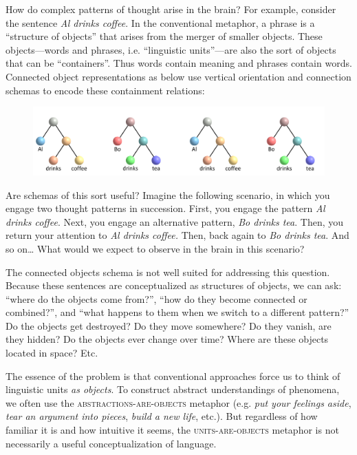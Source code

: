 How do complex patterns of thought arise in the brain? For example, consider the sentence \textit{Al drinks coffee}. In the conventional metaphor, a phrase is a “structure of objects” that arises from the merger of smaller objects. These objects—words and phrases, i.e. “linguistic units”—are also the sort of objects that can be “containers”. Thus words contain meaning and phrases contain words. Connected object representations as below use vertical orientation and connection schemas to encode these containment relations:

  
\begin{figure}
\includegraphics[width=\textwidth]{figures/Tilsen-img8.png}
\caption{\missingcaption}
\label{fig:2:1}
\end{figure}
 

  Are schemas of this sort useful? Imagine the following scenario, in which you engage two thought patterns in succession. First, you engage the pattern \textit{Al drinks coffee}. Next, you engage an alternative pattern, \textit{Bo drinks tea}. Then, you return your attention to \textit{Al drinks coffee.} Then, back again to \textit{Bo drinks tea}. And so on… What would we expect to observe in the brain in this scenario? 

  The connected objects schema is not well suited for addressing this question. Because these sentences are conceptualized as structures of objects, we can ask: “where do the objects come from?”, “how do they become connected or combined?”, and “what happens to them when we switch to a different pattern?” Do the objects get destroyed? Do they move somewhere? Do they vanish, are they hidden? Do the objects ever change over time? Where are these objects located in space? Etc.

  The essence of the problem is that conventional approaches force us to think of linguistic units \textit{as objects}. To construct abstract understandings of phenomena, we often use the \textsc{abstractions-}\textsc{are}\textsc{{}-objects} metaphor (e.g. \textit{put your feelings aside}, \textit{tear an argument into pieces}, \textit{build a new life}, etc.). But regardless of how familiar it is and how intuitive it seems, the \textsc{units}\textsc{{}-are-}\textsc{objects} metaphor is not necessarily a useful conceptualization of language. 

